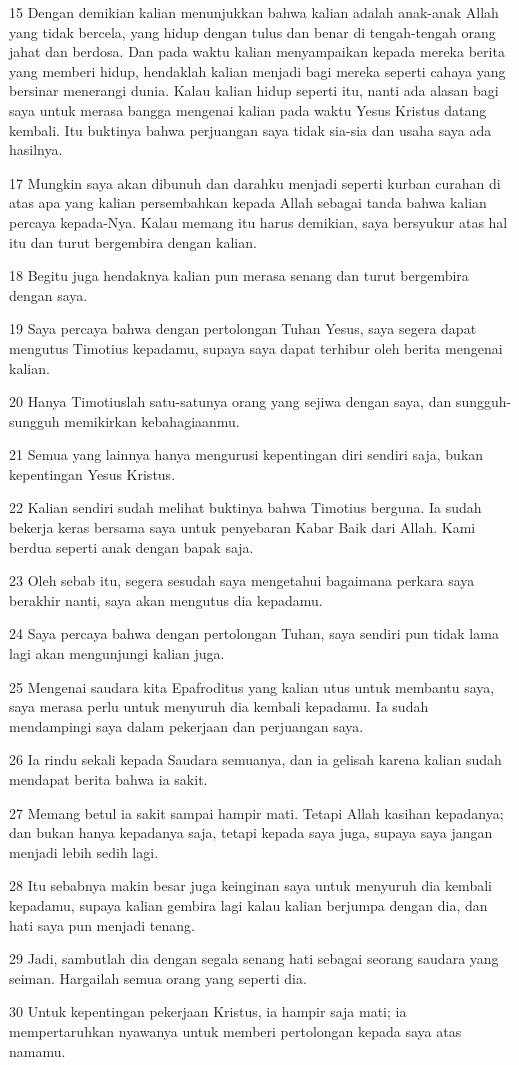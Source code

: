 \par 15 Dengan demikian kalian menunjukkan bahwa kalian adalah anak-anak Allah yang tidak bercela, yang hidup dengan tulus dan benar di tengah-tengah orang jahat dan berdosa. Dan pada waktu kalian menyampaikan kepada mereka berita yang memberi hidup, hendaklah kalian menjadi bagi mereka seperti cahaya yang bersinar menerangi dunia. Kalau kalian hidup seperti itu, nanti ada alasan bagi saya untuk merasa bangga mengenai kalian pada waktu Yesus Kristus datang kembali. Itu buktinya bahwa perjuangan saya tidak sia-sia dan usaha saya ada hasilnya.
\par 17 Mungkin saya akan dibunuh dan darahku menjadi seperti kurban curahan di atas apa yang kalian persembahkan kepada Allah sebagai tanda bahwa kalian percaya kepada-Nya. Kalau memang itu harus demikian, saya bersyukur atas hal itu dan turut bergembira dengan kalian.
\par 18 Begitu juga hendaknya kalian pun merasa senang dan turut bergembira dengan saya.
\par 19 Saya percaya bahwa dengan pertolongan Tuhan Yesus, saya segera dapat mengutus Timotius kepadamu, supaya saya dapat terhibur oleh berita mengenai kalian.
\par 20 Hanya Timotiuslah satu-satunya orang yang sejiwa dengan saya, dan sungguh-sungguh memikirkan kebahagiaanmu.
\par 21 Semua yang lainnya hanya mengurusi kepentingan diri sendiri saja, bukan kepentingan Yesus Kristus.
\par 22 Kalian sendiri sudah melihat buktinya bahwa Timotius berguna. Ia sudah bekerja keras bersama saya untuk penyebaran Kabar Baik dari Allah. Kami berdua seperti anak dengan bapak saja.
\par 23 Oleh sebab itu, segera sesudah saya mengetahui bagaimana perkara saya berakhir nanti, saya akan mengutus dia kepadamu.
\par 24 Saya percaya bahwa dengan pertolongan Tuhan, saya sendiri pun tidak lama lagi akan mengunjungi kalian juga.
\par 25 Mengenai saudara kita Epafroditus yang kalian utus untuk membantu saya, saya merasa perlu untuk menyuruh dia kembali kepadamu. Ia sudah mendampingi saya dalam pekerjaan dan perjuangan saya.
\par 26 Ia rindu sekali kepada Saudara semuanya, dan ia gelisah karena kalian sudah mendapat berita bahwa ia sakit.
\par 27 Memang betul ia sakit sampai hampir mati. Tetapi Allah kasihan kepadanya; dan bukan hanya kepadanya saja, tetapi kepada saya juga, supaya saya jangan menjadi lebih sedih lagi.
\par 28 Itu sebabnya makin besar juga keinginan saya untuk menyuruh dia kembali kepadamu, supaya kalian gembira lagi kalau kalian berjumpa dengan dia, dan hati saya pun menjadi tenang.
\par 29 Jadi, sambutlah dia dengan segala senang hati sebagai seorang saudara yang seiman. Hargailah semua orang yang seperti dia.
\par 30 Untuk kepentingan pekerjaan Kristus, ia hampir saja mati; ia mempertaruhkan nyawanya untuk memberi pertolongan kepada saya atas namamu.

